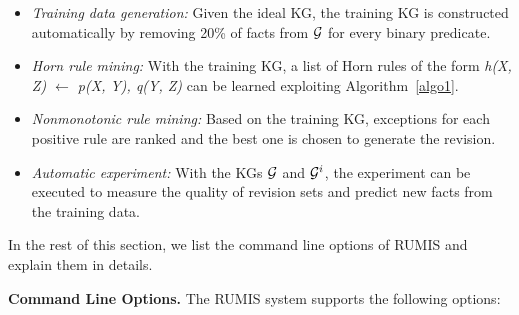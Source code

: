 \begin{itemize}
\item \textit{Training data generation:} Given the ideal KG, the training KG is constructed automatically by removing 20\% of facts from $\mathcal{G}$ for every binary predicate.
\item \textit{Horn rule mining:} With the training KG, a list of Horn rules of the form \textit{h(X, Z) $\leftarrow$ p(X, Y), q(Y, Z)} can be learned exploiting Algorithm~\ref{algo1}.
\item \textit{Nonmonotonic rule mining:} Based on the training KG, exceptions for each positive rule are ranked and the best one is chosen to generate the revision.
\item \textit{Automatic experiment:} With the KGs $\mathcal{G}$ and $\mathcal{G}^i$, the experiment can be executed to measure the quality of revision sets and predict new facts from the training data.
\end{itemize}

In the rest of this section, we list the command line options of RUMIS and explain them in details.

%
%
%

\textbf{Command Line Options.} The RUMIS system supports the following options:

